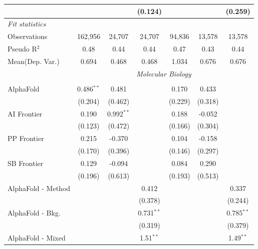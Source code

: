 \begin{tabular}{lcccccc}
                        &               &             & (0.124)        &               &              & (0.259)\\   
   \midrule
   \emph{Fit statistics}\\
   Observations         & 162,956       & 24,707      & 24,707         & 94,836        & 13,578       & 13,578\\  
   Pseudo R$^2$         & 0.48          & 0.44        & 0.44           & 0.47          & 0.43         & 0.44\\  
Mean(Dep. Var.) & 0.694 & 0.468 & 0.468 & 1.034 & 0.676 & 0.676 \\
   
 & \multicolumn{6}{c}{\textit{Molecular Biology}} \\ \\
   AlphaFold            & 0.486$^{**}$ & 0.481        &                & 0.170   & 0.433   &   \\   
                        & (0.204)      & (0.462)      &                & (0.229) & (0.318) &   \\   
   AI Frontier          & 0.190        & 0.992$^{**}$ &                & 0.188   & -0.052  &   \\   
                        & (0.123)      & (0.472)      &                & (0.166) & (0.304) &   \\   
   PP Frontier          & 0.215        & -0.370       &                & 0.104   & -0.158  &   \\   
                        & (0.170)      & (0.396)      &                & (0.146) & (0.297) &   \\   
   SB Frontier          & 0.129        & -0.094       &                & 0.084   & 0.290   &   \\   
                        & (0.196)      & (0.613)      &                & (0.193) & (0.513) &   \\   
   AlphaFold - Method   &              &              & 0.412          &         &         & 0.337\\   
                        &              &              & (0.378)        &         &         & (0.244)\\   
   AlphaFold - Bkg.     &              &              & 0.731$^{**}$   &         &         & 0.785$^{**}$\\   
                        &              &              & (0.319)        &         &         & (0.379)\\   
   AlphaFold - Mixed    &              &              & 1.51$^{**}$    &         &         & 1.49$^{**}$\\   

\end{tabular}
